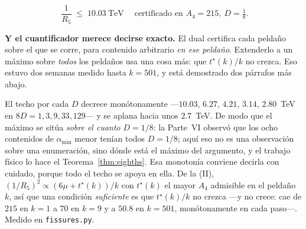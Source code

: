 \documentclass[11pt,a4paper]{article}
\newcommand{\amin}{\alpha_{\min}}
\newenvironment{keyeq}
  {\begin{center}\setlength{\fboxsep}{9pt}\setlength{\fboxrule}{0.8pt}%
   \begin{lrbox}{\keyeqbox}\begin{minipage}{0.88\textwidth}}
  {\end{minipage}\end{lrbox}%
   \fcolorbox{hdrblue!55}{hdrblue!6}{\usebox{\keyeqbox}}\end{center}}
\begin{document}
\begin{keyeq}
\begin{equation}\label{eq:ceiling}
  \boxed{\;\frac{1}{R_5}\;\le\;10.03\ \text{TeV}\;}
  \quad\text{certificado en } A_4=215,\ D=\tfrac18 .
\end{equation}
\end{keyeq}

\noindent \textbf{Y el cuantificador merece decirse exacto.} El dual certifica cada peldaño sobre
el que se corre, para contenido arbitrario \emph{en ese peldaño}. Extenderlo a un máximo sobre
\emph{todos} los peldaños usa una cosa más: que $t^\star(k)/k$ no crezca. Eso estuvo dos semanas
medido hasta $k=501$, y está demostrado dos párrafos más abajo.

\noindent El techo por cada $D$ decrece monótonamente ---$10.03$, $6.27$, $4.21$, $3.14$,
$2.80$~TeV en $8D=1,3,9,33,129$--- y se aplana hacia unos $2.7$~TeV. De modo que el máximo se sitúa
\emph{sobre el cuanto} $D=1/8$: la Parte~VI observó que los ocho contenidos de $\amin$ menor tenían
todos $D=1/8$; aquí eso no es una observación sobre una enumeración, sino dónde está el máximo del
argumento, y el trabajo físico lo hace el Teorema~\ref{thm:eighths}. Esa monotonía conviene decirla
con cuidado, porque todo el techo se apoya en ella. De la (II), $(1/R_5)^2\propto(6\mu+t^\star(k))/k$
con $t^\star(k)$ el mayor $A_4$ admisible en el peldaño $k$, así que una condición \emph{suficiente}
es que $t^\star(k)/k$ no crezca ---y no crece: cae de $215$ en $k=1$ a $70$ en $k=9$ y a $50.8$ en
$k=501$, monótonamente en cada paso---. Medido en \texttt{fissures.py}.
\end{document}
